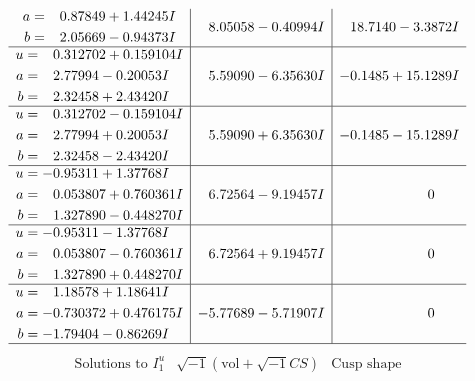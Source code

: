 \documentclass[1p]{elsarticle_modified}
\theoremstyle{definition}
\newcommand{\I}{\sqrt{-1}}
\begin{document}
$$\begin{array}{c|c|c}
\begin{aligned}
a &= \phantom{-}0.87849 + 1.44245 I \\
b &= \phantom{-}2.05669 - 0.94373 I\end{aligned}
 & \phantom{-}8.05058 - 0.40994 I & \phantom{-}18.7140 - 3.3872 I \\ \hline\begin{aligned}
u &= \phantom{-}0.312702 + 0.159104 I \\
a &= \phantom{-}2.77994 - 0.20053 I \\
b &= \phantom{-}2.32458 + 2.43420 I\end{aligned}
 & \phantom{-}5.59090 - 6.35630 I & -0.1485 + 15.1289 I \\ \hline\begin{aligned}
u &= \phantom{-}0.312702 - 0.159104 I \\
a &= \phantom{-}2.77994 + 0.20053 I \\
b &= \phantom{-}2.32458 - 2.43420 I\end{aligned}
 & \phantom{-}5.59090 + 6.35630 I & -0.1485 - 15.1289 I \\ \hline\begin{aligned}
u &= -0.95311 + 1.37768 I \\
a &= \phantom{-}0.053807 + 0.760361 I \\
b &= \phantom{-}1.327890 - 0.448270 I\end{aligned}
 & \phantom{-}6.72564 - 9.19457 I & \phantom{-0.000000 } 0 \\ \hline\begin{aligned}
u &= -0.95311 - 1.37768 I \\
a &= \phantom{-}0.053807 - 0.760361 I \\
b &= \phantom{-}1.327890 + 0.448270 I\end{aligned}
 & \phantom{-}6.72564 + 9.19457 I & \phantom{-0.000000 } 0 \\ \hline\begin{aligned}
u &= \phantom{-}1.18578 + 1.18641 I \\
a &= -0.730372 + 0.476175 I \\
b &= -1.79404 - 0.86269 I\end{aligned}
 & -5.77689 - 5.71907 I & \phantom{-0.000000 } 0\\
 \hline 
 \end{array}$$\newpage$$\begin{array}{c|c|c}  
\text{Solutions to }I^u_{1}& \I (\text{vol} + \sqrt{-1}CS) & \text{Cusp shape}\\
 \hline 
\begin{aligned}

\end{aligned}
\end{array}$$
\end{document}
